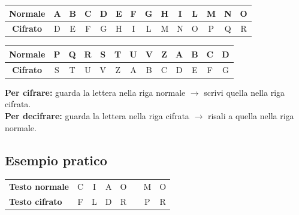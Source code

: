 \documentclass[12pt,a4paper]{article}
\begin{document}
\vspace{0.5em}
\begin{center}
\renewcommand{\arraystretch}{1.4}
\begin{tabular}{|c|c|c|c|c|c|c|c|c|c|c|c|c|c|}
\hline
\rowcolor{cesareblu!80}
\color{white}\textbf{Normale} &
\color{white}A & \color{white}B & \color{white}C &
\color{white}D & \color{white}E & \color{white}F &
\color{white}G & \color{white}H & \color{white}I &
\color{white}L & \color{white}M & \color{white}N &
\color{white}O \\
\hline
\rowcolor{cesaregrigio}
\textbf{Cifrato} &
D & E & F & G & H & I & L & M & N & O & P & Q & R \\
\hline
\end{tabular}

\vspace{0.3em}

\begin{tabular}{|c|c|c|c|c|c|c|c|c|c|c|c|c|}
\hline
\rowcolor{cesareblu!80}
\color{white}\textbf{Normale} &
\color{white}P & \color{white}Q & \color{white}R &
\color{white}S & \color{white}T & \color{white}U &
\color{white}V & \color{white}Z & \color{white}A &
\color{white}B & \color{white}C & \color{white}D\\
\hline
\rowcolor{cesaregrigio}
\textbf{Cifrato} &
S & T & U & V & Z & A & B & C & D & E & F & G \\
\hline
\end{tabular}
\end{center}
\vspace{0.5em}

\textbf{Per cifrare:} guarda la lettera nella riga normale $\rightarrow$
scrivi quella nella riga cifrata.\\
\textbf{Per decifrare:} guarda la lettera nella riga cifrata $\rightarrow$
risali a quella nella riga normale.

\subsection{Esempio pratico}

\vspace{0.5em}
\begin{center}
\renewcommand{\arraystretch}{1.6}
\begin{tabular}{lccccccc}
\toprule
\textbf{Testo normale} & C & I & A & O & \quad & M & O \\
\textbf{Testo cifrato} & F & L & D & R & \quad & P & R \\
\bottomrule
\end{tabular}
\end{center}
\vspace{0.5em}
\end{document}
